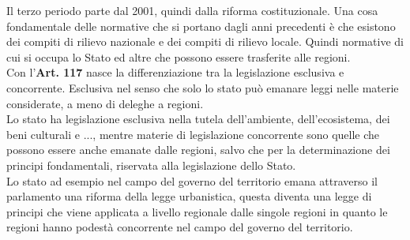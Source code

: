 \documentclass[a4paper,12pt, oneside]{book}
\begin{document}
Il terzo periodo parte dal 2001, quindi dalla riforma costituzionale. Una cosa fondamentale delle normative che si portano dagli anni precedenti è che esistono dei compiti di rilievo nazionale e dei compiti di rilievo locale. Quindi normative di cui si occupa lo Stato ed altre che possono essere trasferite alle regioni.\\
Con l'\textbf{Art. 117} nasce la differenziazione tra la legislazione esclusiva e concorrente. Esclusiva nel senso che solo lo stato può emanare leggi nelle materie considerate, a meno di deleghe a regioni.\\
Lo stato ha legislazione esclusiva nella tutela dell'ambiente, dell'ecosistema, dei beni culturali e ..., mentre materie di legislazione concorrente sono quelle che possono essere anche emanate dalle regioni, salvo che per la determinazione dei principi fondamentali, riservata alla legislazione dello Stato.\\
Lo stato ad esempio nel campo del governo del territorio emana attraverso il parlamento una riforma della legge urbanistica, questa diventa una legge di principi che viene applicata a livello regionale dalle singole regioni in quanto le regioni hanno podestà concorrente nel campo del governo del territorio.\\






%
%
%
%
\end{document}

